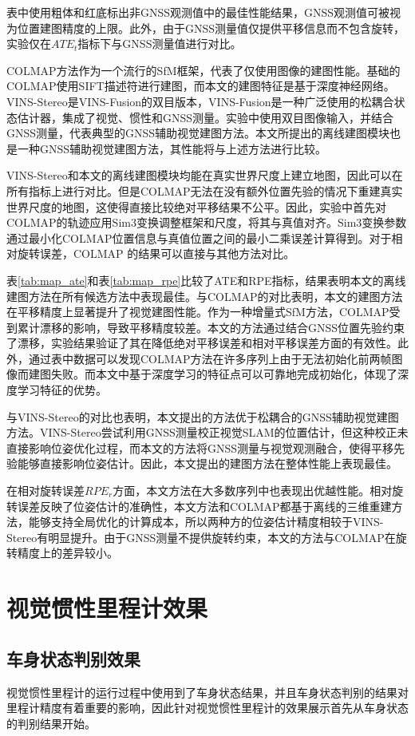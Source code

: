表中使用粗体和红底标出非GNSS观测值中的最佳性能结果，GNSS观测值可被视为位置建图精度的上限。此外，由于GNSS测量值仅提供平移信息而不包含旋转，实验仅在$ATE_t$指标下与GNSS测量值进行对比。

COLMAP方法作为一个流行的SfM框架，代表了仅使用图像的建图性能。基础的COLMAP使用SIFT\cite{lowe2004distinctive}描述符进行建图，而本文的建图特征是基于深度神经网络。VINS-Stereo是VINS-Fusion的双目版本，VINS-Fusion是一种广泛使用的松耦合状态估计器，集成了视觉、惯性和GNSS测量。实验中使用双目图像输入，并结合GNSS测量，代表典型的GNSS辅助视觉建图方法。本文所提出的离线建图模块也是一种GNSS辅助视觉建图方法，其性能将与上述方法进行比较。

VINS-Stereo和本文的离线建图模块均能在真实世界尺度上建立地图，因此可以在所有指标上进行对比。但是COLMAP无法在没有额外位置先验的情况下重建真实世界尺度的地图，这使得直接比较绝对平移结果不公平。因此，实验中首先对COLMAP的轨迹应用Sim3变换调整框架和尺度，将其与真值对齐。Sim3变换参数通过最小化COLMAP位置信息与真值位置之间的最小二乘误差计算得到。对于相对旋转误差，COLMAP 的结果可以直接与其他方法对比。

表\ref{tab:map_ate}和表\ref{tab:map_rpe}比较了ATE和RPE指标，结果表明本文的离线建图方法在所有候选方法中表现最佳。与COLMAP的对比表明，本文的建图方法在平移精度上显著提升了视觉建图性能。作为一种增量式SfM方法，COLMAP受到累计漂移的影响，导致平移精度较差。本文的方法通过结合GNSS位置先验约束了漂移，实验结果验证了其在降低绝对平移误差和相对平移误差方面的有效性。此外，通过表中数据可以发现COLMAP方法在许多序列上由于无法初始化前两帧图像而建图失败。而本文中基于深度学习的特征点可以可靠地完成初始化，体现了深度学习特征的优势。

与VINS-Stereo的对比也表明，本文提出的方法优于松耦合的GNSS辅助视觉建图方法。VINS-Stereo尝试利用GNSS测量校正视觉SLAM的位置估计，但这种校正未直接影响位姿优化过程，而本文的方法将GNSS测量与视觉观测融合，使得平移先验能够直接影响位姿估计。因此，本文提出的建图方法在整体性能上表现最佳。

在相对旋转误差$RPE_r$方面，本文方法在大多数序列中也表现出优越性能。相对旋转误差反映了位姿估计的准确性，本文方法和COLMAP都基于离线的三维重建方法，能够支持全局优化的计算成本，所以两种方的位姿估计精度相较于VINS-Stereo有明显提升。由于GNSS测量不提供旋转约束，本文的方法与COLMAP在旋转精度上的差异较小。

\section{视觉惯性里程计效果}

\subsection{车身状态判别效果}
视觉惯性里程计的运行过程中使用到了车身状态结果，并且车身状态判别的结果对里程计精度有着重要的影响，因此针对视觉惯性里程计的效果展示首先从车身状态的判别结果开始。

